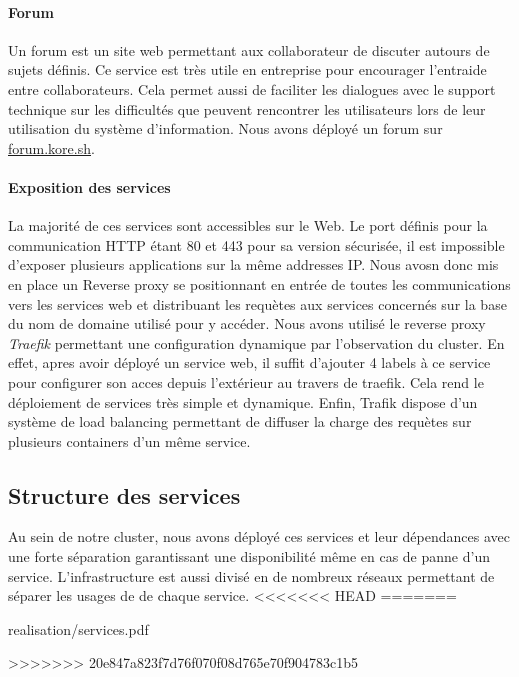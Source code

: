 \paragraph{Forum} Un forum est un site web permettant aux collaborateur de discuter autours de sujets définis.
Ce service est très utile en entreprise pour encourager l'entraide entre collaborateurs.
Cela permet aussi de faciliter les dialogues avec le support technique sur les difficultés que peuvent rencontrer les utilisateurs lors de leur utilisation du système d'information.
Nous avons déployé un forum sur \url{forum.kore.sh}.

\paragraph{Exposition des services} La majorité de ces services sont accessibles sur le Web.
Le port définis pour la communication HTTP étant 80 et 443 pour sa version sécurisée, il est impossible d'exposer plusieurs applications sur la même addresses IP.
Nous avosn donc mis en place un Reverse proxy se positionnant en entrée de toutes les communications vers les services web et distribuant les requètes aux services concernés sur la base du nom de domaine utilisé pour y accéder.
Nous avons utilisé le reverse proxy \emph{Traefik} permettant une configuration dynamique par l'observation du cluster.
En effet, apres avoir déployé un service web, il suffit d'ajouter 4 labels à ce service pour configurer son acces depuis l'extérieur au travers de traefik.
Cela rend le déploiement de services très simple et dynamique.
Enfin, Trafik dispose d'un système de load balancing permettant de diffuser la charge des requètes sur plusieurs containers d'un même service.

\subsection{Structure des services}

Au sein de notre cluster, nous avons déployé ces services et leur dépendances avec une forte séparation garantissant une disponibilité même en cas de panne d'un service.
L'infrastructure est aussi divisé en de nombreux réseaux permettant de séparer les usages de de chaque service.
<<<<<<< HEAD
=======

\begin{figue}{0.94}{realisation/services.pdf}
\end{figue}

\clearpage
>>>>>>> 20e847a823f7d76f070f08d765e70f904783c1b5
